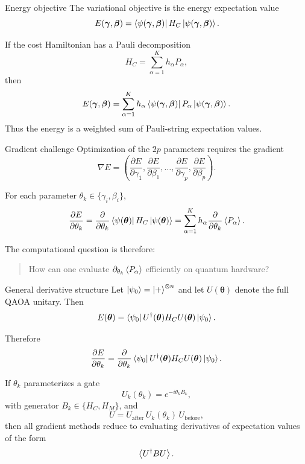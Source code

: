 \documentclass[aspectratio=169]{beamer}
\begin{document}
\begin{frame}{Energy objective}
The variational objective is the energy expectation value
\[
E(\bm{\gamma},\bm{\beta})
=
\bra{\psi(\bm{\gamma},\bm{\beta})}H_C\ket{\psi(\bm{\gamma},\bm{\beta})}.
\]

If the cost Hamiltonian has a Pauli decomposition
\[
H_C = \sum_{\alpha=1}^{K} h_\alpha P_\alpha,
\]
then
\[
E(\bm{\gamma},\bm{\beta})
=
\sum_{\alpha=1}^{K} h_\alpha
\bra{\psi(\bm{\gamma},\bm{\beta})}P_\alpha\ket{\psi(\bm{\gamma},\bm{\beta})}.
\]
Thus the energy is a weighted sum of Pauli-string expectation values.
\end{frame}

\begin{frame}{Gradient challenge}
Optimization of the \(2p\) parameters requires the gradient
\[
\nabla E
=
\left(
\frac{\partial E}{\partial \gamma_1},
\frac{\partial E}{\partial \beta_1},
\dots,
\frac{\partial E}{\partial \gamma_p},
\frac{\partial E}{\partial \beta_p}
\right).
\]

For each parameter \(\theta_k\in\{\gamma_i,\beta_i\}\),
\[
\frac{\partial E}{\partial \theta_k}
=
\frac{\partial}{\partial \theta_k}
\bra{\psi(\bm{\theta})}H_C\ket{\psi(\bm{\theta})}
=
\sum_{\alpha=1}^{K} h_\alpha
\frac{\partial}{\partial \theta_k}\expval{P_\alpha}.
\]

The computational question is therefore:
\begin{quote}
How can one evaluate \(\partial_{\theta_k}\expval{P_\alpha}\) efficiently on quantum hardware?
\end{quote}
\end{frame}

\begin{frame}{General derivative structure}
Let \(\ket{\psi_0}=\ket{+}^{\otimes n}\) and let \(U(\bm{\theta})\) denote the full QAOA unitary.
Then
\[
E(\bm{\theta})
=
\bra{\psi_0}U^\dagger(\bm{\theta})H_CU(\bm{\theta})\ket{\psi_0}.
\]

Therefore
\[
\frac{\partial E}{\partial \theta_k}
=
\frac{\partial}{\partial \theta_k}
\bra{\psi_0}U^\dagger(\bm{\theta})H_CU(\bm{\theta})\ket{\psi_0}.
\]

If \(\theta_k\) parameterizes a gate
\[
U_k(\theta_k)=e^{-i\theta_k B_k},
\]
with generator \(B_k\in\{H_C,H_M\}\), and
\[
U = U_{\text{after}}\, U_k(\theta_k)\, U_{\text{before}},
\]
then all gradient methods reduce to evaluating derivatives of expectation values of the form
\[
\expval{U^\dagger B U}.
\]
\end{frame}
\end{document}
